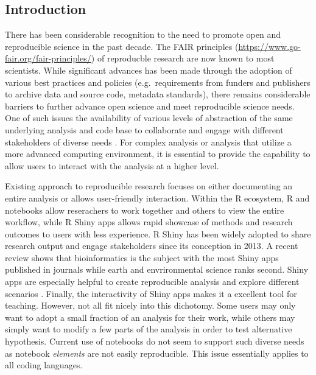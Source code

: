 \hypertarget{introduction}{%
\subsection{Introduction}\label{introduction}}

There has been considerable recognition to the need to promote open and
reproducible science in the past decade. The FAIR principles
\citep{Wilkinson2016a, Stall2019}
(\url{https://www.go-fair.org/fair-principles/}) of reproducble research
are now known to most scientists. While significant advances has been
made through the adoption of various best practices and policies
(e.g.~requirements from funders and publishers to archive data and
source code, metadata standards), there remains considerable barriers to
further advance open science and meet reproducible science needs. One of
such issues the availability of various levels of abstraction of the
same underlying analysis and code base to collaborate and engage with
different stakeholders of diverse needs \citep{Blair2019, Hollaway2020}.
For complex analysis or analysis that utilize a more advanced computing
environment, it is essential to provide the capability to allow users to
interact with the analysis at a higher level.

Existing approach to reproducible research focuses on either documenting
an entire analysis or allows user-friendly interaction. Within the R
ecosystem, R \DIFdelbegin {}\DIFdelend \DIFaddbegin {}\DIFaddend and notebooks allow reserachers to work together
and others to view the entire workflow, while R Shiny apps \citep{shiny}
allows rapid showcase of methods and research outcomes to users with
less experience. R Shiny has been widely adopted to share research
output and engage stakeholders since its conception in 2013. A recent
review \citep{Kasprzak} shows that bioinformatics is the subject with
the most Shiny apps published in journals while earth and envrironmental
science ranks second. Shiny apps are especially helpful to create
reproducible analysis \citep[e.g.~examples in][]{Hollaway2020} and
explore different scenarios \citep[e.g.][]{Whateley2015, Mose2018}.
Finally, the interactivity of Shiny apps makes it a excellent tool for
teaching\citep[e.g.][]{Williams2017, adventr}. However, not all \DIFdelbegin {}\DIFdelend \DIFaddbegin {}\DIFaddend fit nicely into this dichotomy. Some users may only want to adopt a
small fraction of an analysis for their work, while others may simply
want to modify a few parts of the analysis in order to test alternative
hypothesis. Current use of notebooks do not seem to support such diverse
needs as notebook \DIFaddbegin {}\DIFaddend \emph{elements} \DIFaddbegin {}\DIFaddend are
not easily reproducible. This issue essentially applies to all coding
languages.

